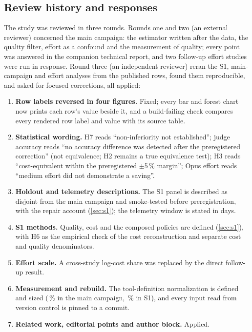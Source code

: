 \subsection{Review history and responses}\label{sec:review}

The study was reviewed in three rounds. Rounds one and two (an external reviewer) concerned the main campaign: the
estimator written after the data, the quality filter, effort as a confound and the measurement of quality; every
point was answered in the companion technical report, and two follow-up effort studies were run in response. Round
three (an independent reviewer) reran the S1, main-campaign and effort analyses from the published rows, found them
reproducible, and asked for focused corrections, all applied:
\begin{enumerate}[leftmargin=1.6em]
  \item \textbf{Row labels reversed in four figures.} Fixed; every bar and forest chart now prints each row's value
    beside it, and a build-failing check compares every rendered row label and value with its source table.
  \item \textbf{Statistical wording.} H7 reads ``non-inferiority not established''; judge accuracy reads ``no accuracy
    difference was detected after the preregistered correction'' (not equivalence; H2 remains a true equivalence
    test); H3 reads ``cost-equivalent within the preregistered $\pm$5\,\% margin''; Opus effort reads ``medium effort
    did not demonstrate a saving''.
  \item \textbf{Holdout and telemetry descriptions.} The S1 panel is described as disjoint from the main campaign and
    smoke-tested before preregistration, with the repair account (\cref{sec:s1}); the telemetry window is stated in days.
  \item \textbf{S1 methods.} Quality, cost and the composed policies are defined (\cref{sec:s1}), with H6 as the
    empirical check of the cost reconstruction and separate cost and quality denominators.
  \item \textbf{Effort scale.} A cross-study log-cost share was replaced by the direct follow-up result.
  \item \textbf{Measurement and rebuild.} The tool-definition normalization is defined and sized (\NormShareMain\,\% in
    the main campaign, \NormShareSone\,\% in S1), and every input read from version control is pinned to a commit.
  \item \textbf{Related work, editorial points and author block.} Applied.
\end{enumerate}
